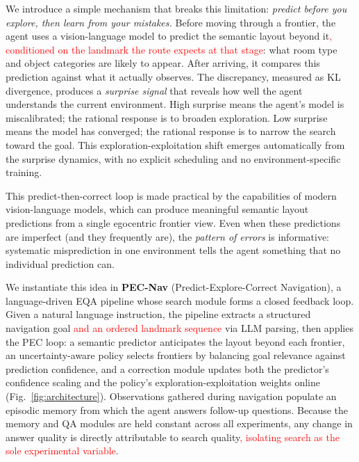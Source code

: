 We introduce a simple mechanism that breaks this limitation: \emph{predict before you explore, then learn from your mistakes.} Before moving through a frontier, the agent uses a vision-language model to predict the semantic layout beyond it\textcolor{red}{, conditioned on the landmark the route expects at that stage}: what room type and object categories are likely to appear. After arriving, it compares this prediction against what it actually observes. The discrepancy, measured as KL divergence, produces a \emph{surprise signal} that reveals how well the agent understands the current environment. High surprise means the agent's model is miscalibrated; the rational response is to broaden exploration. Low surprise means the model has converged; the rational response is to narrow the search toward the goal. This exploration-exploitation shift emerges automatically from the surprise dynamics, with no explicit scheduling and no environment-specific training.

This predict-then-correct loop is made practical by the capabilities of modern vision-language models, which can produce meaningful semantic layout predictions from a single egocentric frontier view. Even when these predictions are imperfect (and they frequently are), the \emph{pattern of errors} is informative: systematic misprediction in one environment tells the agent something that no individual prediction can.

We instantiate this idea in \textbf{PEC-Nav} (Predict-Explore-Correct Navigation), a language-driven EQA pipeline whose search module forms a closed feedback loop. Given a natural language instruction, the pipeline extracts a structured navigation goal \textcolor{red}{and an ordered landmark sequence }via LLM parsing, then applies the PEC loop: a semantic predictor anticipates the layout beyond each frontier, an uncertainty-aware policy selects frontiers by balancing goal relevance against prediction confidence, and a correction module updates both the predictor's confidence scaling and the policy's exploration-exploitation weights online (Fig.~\ref{fig:architecture}). Observations gathered during navigation populate an episodic memory from which the agent answers follow-up questions. Because the memory and QA modules are held constant across all experiments, any change in answer quality is directly attributable to search quality\textcolor{red}{, isolating search as the sole experimental variable}.

